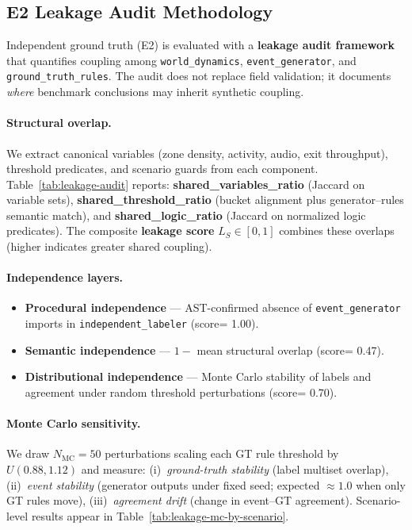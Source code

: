 \subsection{E2 Leakage Audit Methodology}
\label{sec:leakage-analysis}

Independent ground truth (E2) is evaluated with a \textbf{leakage audit framework} that quantifies
coupling among \texttt{world\_dynamics}, \texttt{event\_generator}, and
\texttt{ground\_truth\_rules}. The audit does not replace field validation; it documents
\emph{where} benchmark conclusions may inherit synthetic coupling.

\paragraph{Structural overlap.}
We extract canonical variables (zone density, activity, audio, exit throughput), threshold
predicates, and scenario guards from each component. Table~\ref{tab:leakage-audit} reports:
\textbf{shared\_variables\_ratio} (Jaccard on variable sets),
\textbf{shared\_threshold\_ratio} (bucket alignment plus generator--rules semantic match),
and \textbf{shared\_logic\_ratio} (Jaccard on normalized logic predicates).
The composite \textbf{leakage score} $L_S \in [0,1]$ combines these overlaps (higher indicates
greater shared coupling).

\paragraph{Independence layers.}
\begin{itemize}[noitemsep]
  \item \textbf{Procedural independence} --- AST-confirmed absence of
        \texttt{event\_generator} imports in \texttt{independent\_labeler} (score=
        1.00).
  \item \textbf{Semantic independence} --- $1 - $ mean structural overlap (score=
        0.47).
  \item \textbf{Distributional independence} --- Monte Carlo stability of labels and
        agreement under random threshold perturbations (score=
        0.70).
\end{itemize}

\paragraph{Monte Carlo sensitivity.}
We draw $N_{\mathrm{MC}}=50$ perturbations scaling each GT rule
threshold by $U(0.88, 1.12)$ and measure:
(i)~\emph{ground-truth stability} (label multiset overlap),
(ii)~\emph{event stability} (generator outputs under fixed seed; expected $\approx 1.0$ when
only GT rules move),
(iii)~\emph{agreement drift} (change in event--GT agreement).
Scenario-level results appear in Table~\ref{tab:leakage-mc-by-scenario}.

